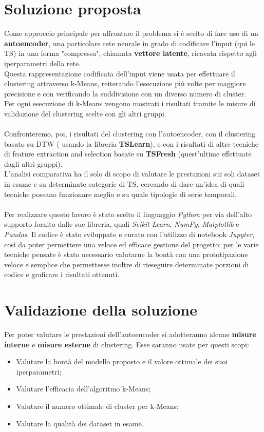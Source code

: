 \section{Soluzione proposta}
Come approccio principale per affrontare il problema si è scelto di fare uso di un \textbf{autoencoder}, una particolare rete neurale in grado di codificare l'input (qui le TS) in una forma "compressa", chiamata \textbf{vettore latente}, ricavata rispetto agli iperparametri della rete.\\
Questa rappresentazione codificata dell'input viene usata per effettuare il clustering attraverso k-Means, reiterando l'esecuzione più volte per maggiore precisione e con verificando la suddivisione con un diverso numero di cluster.\\
Per ogni esecuzione di k-Means vengono mostrati i risultati tramite le misure di validazione del clustering scelte con gli altri gruppi.\\
\\
Confronteremo, poi, i risultati del clustering con l'autoencoder, con il clustering basato su DTW ( usando la libreria \textbf{TSLearn}), e con i risultati di altre tecniche di feature extraction and selection basate su \textbf{TSFresh} (quest'ultime effettuate dagli altri gruppi).\\
L'analisi comparativa ha il solo di scopo di valutare le prestazioni sui soli dataset in esame e su determinate categorie di TS, cercando di dare un'idea di quali tecniche possano funzionare meglio e su quale tipologie di serie temporali.\\
\\
Per realizzare questo lavoro è stato scelto il linguaggio \textit{Python} per via dell'alto supporto fornito dalle sue libreria, quali \textit{Scikit-Learn}\cite{sklearn_api}, \textit{NumPy}\cite{numpy}, \textit{Matplotlib}\cite{matplotlib} e \textit{Pandas}\cite{pandas}. Il codice è stato sviluppato e curato con l'utilizzo di notebook \textit{Jupyter}, così da poter permettere una veloce ed efficace gestione del progetto: per le varie tecniche pensate è stato necessario valutarne la bontà con una prototipazione veloce e semplice che permettesse inoltre di rieseguire determinate porzioni di codice e graficare i risultati ottenuti.\\

\section{Validazione della soluzione}
Per poter valutare le prestazioni dell'autoencoder si adotteranno alcune \textbf{misure interne} e \textbf{misure esterne}\cite{metrics} di clustering. Esse saranno usate per questi scopi:
\begin{itemize}
	\item Valutare la bontà del modello proposto e il valore ottimale dei suoi iperparametri;
	\item Valutare l'efficacia dell'algoritmo k-Means;
	\item Valutare il numero ottimale di cluster per k-Means;
	\item Valutare la qualità dei dataset in esame.
\end{itemize}

